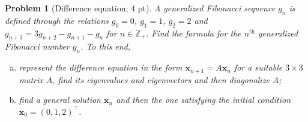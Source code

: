 \documentclass[12pt,a4]{article}
\newtheorem{problem}{Problem}
\newcommand{\bx}{{\mathbf x}}
\begin{document}
\begin{problem}[Difference equation; 4 pt]\rm
A \emph{generalized Fibonacci} sequence $g_n$ is defined through the relations $g_0 = 0$, $g_1 = 1$, $g_2=2$ and $g_{n+3} = 3g_{n+2} - g_{n+1} - g_n$ for $n\in\mathbb{Z}_+$. Find the formula for the $n^{\mathrm{th}}$ generalized Fibonacci number $g_n$. To this end,
\begin{enumerate}[(a)]
	\item represent the difference equation in the form $\bx_{n+1} = A\bx_n$ for a suitable $3 \times 3$ matrix $A$,
	 find its eigenvalues and eigenvectors and then diagonalize $A$;
	\item find a general solution $\bx_n$ and then the one satisfying the initial condition $\bx_0 = (0,1,2)^\top$.
\end{enumerate}
\end{problem}
\end{document}
